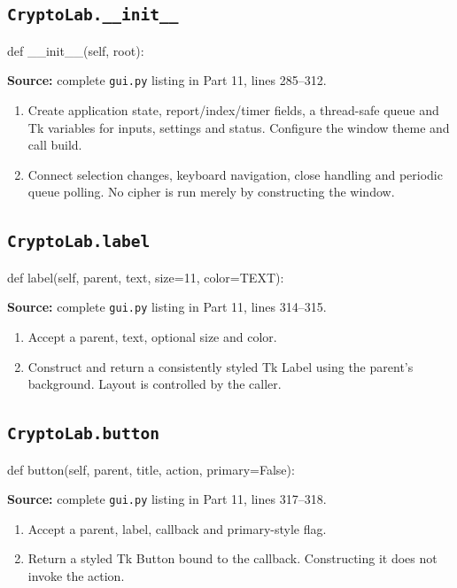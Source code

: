 \subsection{\texttt{CryptoLab.\_\allowbreak{}\_\allowbreak{}init\_\allowbreak{}\_\allowbreak{}}}
\begin{lightcode}
def __init__(self, root):
\end{lightcode}
\noindent\textbf{Source:} complete \texttt{gui.py} listing in Part 11, lines 285--312.
\begin{enumerate}
\item Create application state, report/index/timer fields, a thread-safe queue and Tk variables for inputs, settings and status. Configure the window theme and call build.
\item Connect selection changes, keyboard navigation, close handling and periodic queue polling. No cipher is run merely by constructing the window.
\end{enumerate}
\subsection{\texttt{CryptoLab.label}}
\begin{lightcode}
def label(self, parent, text, size=11, color=TEXT):
\end{lightcode}
\noindent\textbf{Source:} complete \texttt{gui.py} listing in Part 11, lines 314--315.
\begin{enumerate}
\item Accept a parent, text, optional size and color.
\item Construct and return a consistently styled Tk Label using the parent's background. Layout is controlled by the caller.
\end{enumerate}
\subsection{\texttt{CryptoLab.button}}
\begin{lightcode}
def button(self, parent, title, action, primary=False):
\end{lightcode}
\noindent\textbf{Source:} complete \texttt{gui.py} listing in Part 11, lines 317--318.
\begin{enumerate}
\item Accept a parent, label, callback and primary-style flag.
\item Return a styled Tk Button bound to the callback. Constructing it does not invoke the action.
\end{enumerate}
